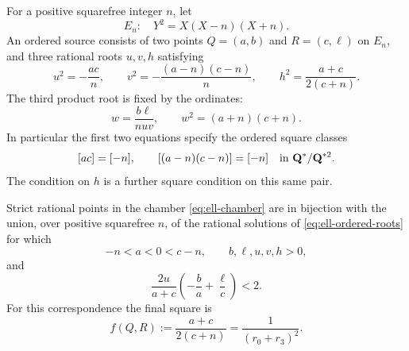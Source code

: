 For a positive squarefree integer $n$, let
\[
 E_n:\quad Y^2=X(X-n)(X+n).
\]
An ordered source consists of two points
$Q=(a,b)$ and $R=(c,\ell)$ on $E_n$, and three rational roots
$u,v,h$ satisfying
\begin{equation}\label{eq:ell-ordered-roots}
 u^2=-\frac{ac}{n},\qquad
 v^2=-\frac{(a-n)(c-n)}{n},\qquad
 h^2=\frac{a+c}{2(c+n)}.
\end{equation}
The third product root is fixed by the ordinates:
\begin{equation}\label{eq:ell-w-ordinate}
 w=\frac{b\ell}{nuv},\qquad w^2=(a+n)(c+n).
\end{equation}
In particular the first two equations specify the ordered square classes
\[
 [ac]=[-n],\qquad [(a-n)(c-n)]=[-n]
 \quad\text{in }\mathbf Q^*/\mathbf Q^{*2}.
\]
The condition on $h$ is a further square condition on this same pair.

\begin{theorem}
\label{thm:ell-exact-source}
Strict rational points in the chamber \eqref{eq:ell-chamber} are in
bijection with the union, over positive squarefree $n$, of the rational
solutions of \eqref{eq:ell-ordered-roots} for which
\begin{equation}\label{eq:ell-source-signs}
 -n<a<0<c-n,\qquad b,\ell,u,v,h>0,
\end{equation}
and
\begin{equation}\label{eq:ell-strict-metric}
 \frac{2u}{a+c}\left(-\frac ba+\frac\ell c\right)<2.
\end{equation}
For this correspondence the final square is
\begin{equation}\label{eq:ell-final-square}
 f(Q,R):=\frac{a+c}{2(c+n)}
       =\frac{1}{(r_0+r_3)^2}.
\end{equation}
\end{theorem}

